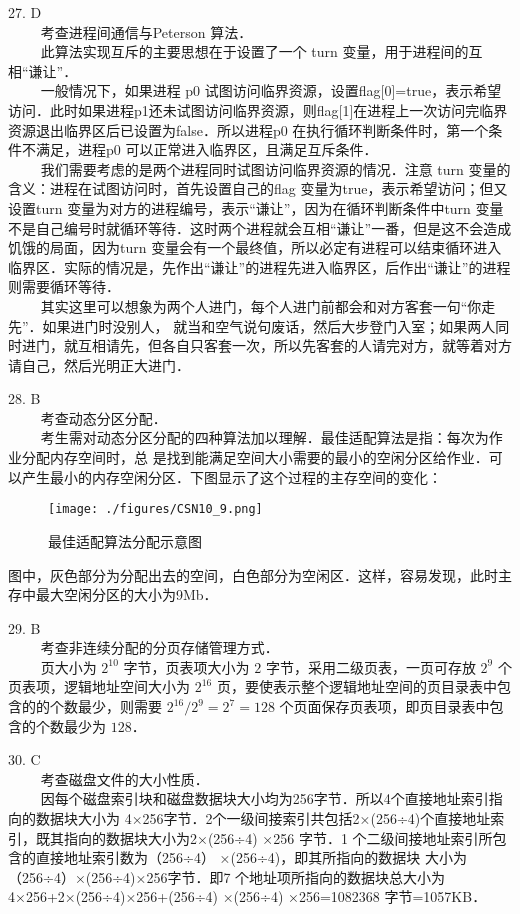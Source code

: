 27. D \\
$\qquad$ 考查进程间通信与Peterson 算法．\\
$\qquad$ 此算法实现互斥的主要思想在于设置了一个 turn 变量，用于进程间的互相“谦让”．\\
$\qquad$ 一般情况下，如果进程 p0 试图访问临界资源，设置flag[0]=true，表示希望访问．此时如果进程p1还未试图访问临界资源，则flag[1]在进程上一次访问完临界资源退出临界区后已设置为false．所以进程p0 在执行循环判断条件时，第一个条件不满足，进程p0 可以正常进入临界区，且满足互斥条件．\\
$\qquad$ 我们需要考虑的是两个进程同时试图访问临界资源的情况．注意 turn 变量的含义：进程在试图访问时，首先设置自己的flag 变量为true，表示希望访问；但又设置turn 变量为对方的进程编号，表示“谦让”，因为在循环判断条件中turn 变量不是自己编号时就循环等待．这时两个进程就会互相“谦让”一番，但是这不会造成饥饿的局面，因为turn 变量会有一个最终值，所以必定有进程可以结束循环进入临界区．实际的情况是，先作出“谦让”的进程先进入临界区，后作出“谦让”的进程则需要循环等待．\\
$\qquad$ 其实这里可以想象为两个人进门，每个人进门前都会和对方客套一句“你走先”．如果进门时没别人，
就当和空气说句废话，然后大步登门入室；如果两人同时进门，就互相请先，但各自只客套一次，所以先客套的人请完对方，就等着对方请自己，然后光明正大进门．

28. B \\
$\qquad$ 考查动态分区分配．\\
$\qquad$ 考生需对动态分区分配的四种算法加以理解．最佳适配算法是指：每次为作业分配内存空间时，总
是找到能满足空间大小需要的最小的空闲分区给作业．可以产生最小的内存空闲分区．下图显示了这个过程的主存空间的变化：
\begin{figure}[ht]
\centering
\texttt{[image: ./figures/CSN10\_9.png]}
\caption{最佳适配算法分配示意图} \label{CSN10_fig9}
\end{figure}
图中，灰色部分为分配出去的空间，白色部分为空闲区．这样，容易发现，此时主存中最大空闲分区的大小为9Mb．

29. B \\
$\qquad$ 考查非连续分配的分页存储管理方式．\\
$\qquad$ 页大小为 $2^{10}$ 字节，页表项大小为 $2$ 字节，采用二级页表，一页可存放 $2^9$ 个页表项，逻辑地址空间大小为 $2^{16}$ 页，要使表示整个逻辑地址空间的页目录表中包含的的个数最少，则需要 $2^{16}/2^9=2^7=128$ 个页面保存页表项，即页目录表中包含的个数最少为 $128$．

30. C \\
$\qquad$ 考查磁盘文件的大小性质．\\
$\qquad$ 因每个磁盘索引块和磁盘数据块大小均为256字节．所以4个直接地址索引指向的数据块大小为
4×256字节．2个一级间接索引共包括2×(256÷4)个直接地址索引，既其指向的数据块大小为2×(256÷4)
×256 字节．1 个二级间接地址索引所包含的直接地址索引数为（256÷4） ×(256÷4)，即其所指向的数据块
大小为（256÷4）×(256÷4)×256字节．即7 个地址项所指向的数据块总大小为4×256+2×(256÷4)×256+(256÷4) ×(256÷4) ×256=1082368 字节=1057KB．

